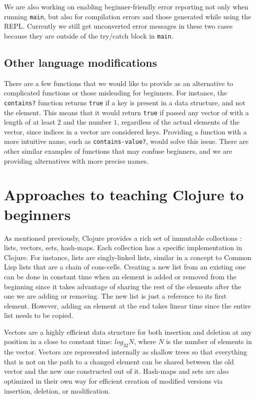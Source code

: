 \documentclass[submission,copyright,creativecommons]{eptcs}
\newcommand{\allcomments}[1]{{#1}}
\newcommand{\todo}[1]{{\bf \color{magenta}{\allcomments{ To-do: {#1}}}}}
\begin{document}
We are also working on enabling beginner-friendly error reporting not only when running {\tt main}, but also for compilation errors and those generated while using the REPL. Currently we still get unconverted error messages in these two cases because they are outside of the try/catch block in {\tt main}. 

\subsection{Other language modifications}\label{subsec:other}
There are a few functions that we would like to provide as an alternative to complicated functions or those misleading for beginners. For instance, the {\tt contains?} function returns {\tt true} if a key is present in a data structure, and not the element. This means that it would return {\tt true} if passed any vector of with a length of at least $2$ and the number $1$, regardless of the actual elements of the vector, since indices in a vector are considered keys. Providing a function with a more intuitive name, such as {\tt contains-value?}, would solve this issue. There are other similar examples of functions that may confuse beginners, and we are providing alternatives with more precise names.


\section{Approaches to teaching Clojure to beginners}\label{sec:approaches}
As mentioned previously, Clojure provides a rich set of immutable collections : lists, vectors, sets, hash-maps. Each collection has a specific implementation in Clojure. For instance, lists are singly-linked lists, similar in a concept to Common Lisp lists that are a chain of cons-cells. Creating a new list from an existing one can be done in constant time when an element is added or removed from the beginning since it takes advantage of sharing the rest of the elements after the one we are adding or removing. The new list is just a reference to its first element. However, adding an element at the end takes linear time since the entire list needs to be copied. 

Vectors are a highly efficient data structure for both insertion and deletion at any position in a close to constant time: $log_{32} N$, where $N$ is the number of elements in the vector. Vectors are represented internally as shallow trees so that everything that is not on the path to a changed element can be shared between the old vector and the new one constructed out of it. Hash-maps and sets are also optimized in their own way for efficient creation of modified versions via insertion, deletion, or modification. 
\end{document}
